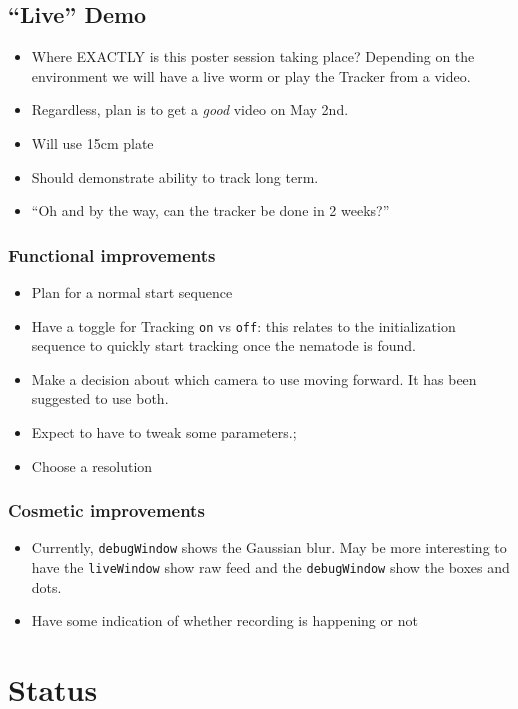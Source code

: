 \documentclass{article}
\begin{document}
\subsection{``Live'' Demo}
\begin{itemize}
\item Where EXACTLY is this poster session taking place? Depending on the environment we will have a live worm or play the Tracker from a video.
\item Regardless, plan is to get a \textit{good} video on May 2nd.
\item Will use 15cm plate
\item Should demonstrate ability to track long term. 
\item ``Oh and by the way, can the tracker be done in 2 weeks?''
\end{itemize}


\subsubsection{Functional improvements}
\begin{itemize}
\item Plan for a normal start sequence
\item Have a toggle for Tracking \verb|on| vs \verb|off|: this relates to the initialization sequence to quickly start tracking once the nematode is found. 
\item Make a decision about which camera to use moving forward. It has been suggested to use both. 
\item Expect to have to tweak some parameters.; 
\item Choose a resolution
\end{itemize}

\subsubsection{Cosmetic improvements}
\begin{itemize}
\item Currently, \verb|debugWindow| shows the Gaussian blur. May be more interesting to have the \verb|liveWindow| show raw feed and the \verb|debugWindow| show the boxes and dots. 
\item Have some indication of whether recording is happening or not
\end{itemize}

\section{Status}
\end{document}
